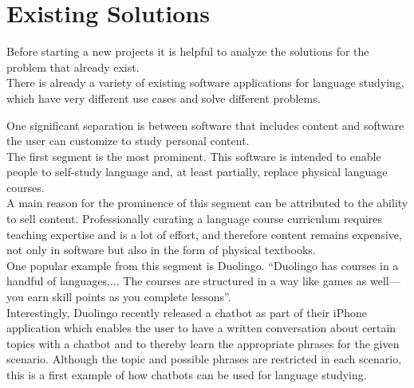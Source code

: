 \section{Existing Solutions}

Before starting a new projects it is helpful to analyze the solutions for the problem that already exist.
\\
There is already a variety of existing software applications for language studying, which have very different use cases and solve different problems.

One significant separation is between software that includes content and software the user can customize to study personal content.
\\

The first segment is the most prominent. This software is intended to enable people to self-study language and, at least partially, replace physical language courses.
\\
A main reason for the prominence of this segment can be attributed to the ability to sell content.
Professionally curating a language course curriculum requires teaching expertise and is a lot of effort, and therefore content remains expensive, not only in software but also in the form of physical textbooks.
\\
One popular example from this segment is Duolingo. ``Duolingo has courses in a handful of languages.... The courses are structured in a way like games as well—you earn skill points as you complete lessons''\cite{lifehacker}.
\\
Interestingly, Duolingo recently released a chatbot\cite{topbots2} as part of their iPhone application which enables the user to have a written conversation about certain topics with a chatbot and to thereby learn the appropriate phrases for the given scenario. Although the topic and possible phrases are restricted in each scenario, this is a first example of how chatbots can be used for language studying.



